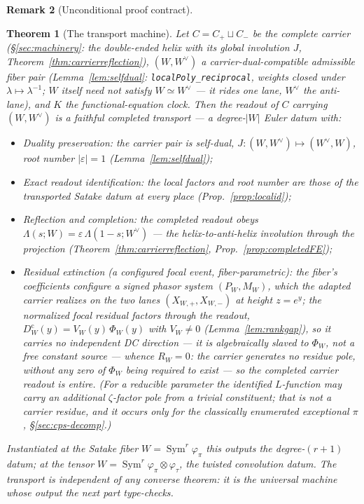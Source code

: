 \documentclass[11pt]{article}
\newtheorem{theorem}{Theorem}
\theoremstyle{definition}
\newtheorem{remark}[theorem]{Remark}
\newcommand{\Sym}{\operatorname{Sym}}
\begin{document}
\begin{remark}[Unconditional proof contract]
\begin{enumerate}
\begin{theorem}[The transport machine]\label{thm:transport}
Let $C=C_+\sqcup C_-$ be the complete carrier (\S\ref{sec:machinery}: the double-ended helix with its global
involution $J$, Theorem~\ref{thm:carrierreflection}), $(W,W^\vee)$ a \emph{carrier-dual-compatible} admissible
fiber pair (Lemma~\ref{lem:selfdual}: \texttt{localPoly\_reciprocal}, weights closed under
$\lambda\mapsto\lambda^{-1}$; $W$ itself need not satisfy $W\simeq W^\vee$ --- it rides one lane, $W^\vee$ the
anti-lane), and $K$ the functional-equation clock. Then the readout of $C$ carrying $(W,W^\vee)$ is a
\emph{faithful completed transport} --- a degree-$|W|$ Euler datum with:
\begin{itemize}
\item[\textup{(a)}] \emph{Duality preservation}: the carrier pair is self-dual, $J\colon(W,W^\vee)\mapsto
(W^\vee,W)$, root number $|\varepsilon|=1$ (Lemma~\ref{lem:selfdual});
\item[\textup{(b)}] \emph{Exact readout identification}: the local factors and root number are those of the
transported Satake datum at every place (Prop.~\ref{prop:localid});
\item[\textup{(c)}] \emph{Reflection and completion}: the completed readout obeys
$\Lambda(s;W)=\varepsilon\,\Lambda(1-s;W^\vee)$ --- the helix-to-anti-helix involution through the projection
(Theorem~\ref{thm:carrierreflection}, Prop.~\ref{prop:completedFE});
\item[\textup{(d)}] \emph{Residual extinction (a configured focal event, fiber-parametric)}: the fiber's
coefficients configure a signed phasor system $(P_W,M_W)$, which the adapted carrier realizes on the two lanes
$(X_{W,+},X_{W,-})$ at height $z=e^y$; the normalized focal residual factors through the readout,
$D^{\mathrm c}_W(y)=V_W(y)\,\Phi_W(y)$ with $V_W\neq0$ (Lemma~\ref{lem:rankgap}), so it carries \emph{no
independent} DC direction --- it is algebraically slaved to $\Phi_W$, not a free constant source --- whence
$R_W=0$: \emph{the carrier generates no residue pole}, without any zero of $\Phi_W$ being required to exist ---
so the completed carrier readout is entire. (For a reducible parameter the identified $L$-function may carry an
additional $\zeta$-factor pole from a trivial constituent; that is not a carrier residue, and it occurs only
for the classically enumerated exceptional $\pi$, \S\ref{sec:cps-decomp}.)
\end{itemize}
Instantiated at the Satake fiber $W=\Sym^r\varphi_\pi$ this outputs the degree-$(r+1)$ datum; at the tensor
$W=\Sym^r\varphi_\pi\otimes\varphi_\tau$, the twisted convolution datum. The transport is independent of any
converse theorem: it is the universal machine whose output the next part type-checks.
\end{theorem}


\end{enumerate}
\end{remark}
\end{document}
